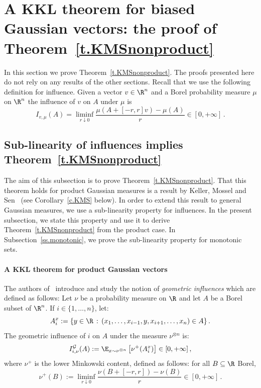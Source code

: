 \section{A KKL theorem for biased Gaussian vectors: the proof of Theorem~\ref{t.KMSnonproduct}}\label{s.KMS}

In this section we prove Theorem~\ref{t.KMSnonproduct}. The proofs presented here do not rely on any results of the other sections. Recall that we use the following definition for influence. Given a vector $v\in\R^n$ and a Borel probability measure $\mu$ on $\R^n$ the influence of $v$ on $A$ under $\mu$ is
\[
I_{v,\mu}(A)=\underset{r \downarrow 0}{\liminf}\frac{\mu \left(A+[-r,r]v \right) - \mu \left(A \right)}{r} \in [0,+\infty]\,.
\]
\subsection{Sub-linearity of influences implies Theorem~\ref{t.KMSnonproduct}}\label{ss.KMSnonproduct}

The aim of this subsection is to prove Theorem~\ref{t.KMSnonproduct}. That this theorem holds for product Gaussian measures is a result by Keller, Mossel and Sen~\cite{keller2012geometric} (see Corollary~\ref{c.KMS} below). In order to extend this result to general Gaussian measures, we use a sub-linearity property for influences. In the present subsection, we state this property and use it to derive Theorem~\ref{t.KMSnonproduct} from the product case. In Subsection~\ref{ss.monotonic}, we prove the sub-linearity property for monotonic sets.

\paragraph{A KKL theorem for product Gaussian vectors} The authors of~\cite{keller2012geometric} introduce and study the notion of \emph{geometric influences} which are defined as follows: Let $\nu$ be a probability measure on $\R$ and let $A$ be a Borel subset of $\R^n$. If $i \in \lbrace 1,\dots, n \rbrace$, let:
\[
A_i^x := \lbrace y \in \R \, : \, (x_1,\dots, x_{i-1}, y, x_{i+1},\dots, x_n) \in A \rbrace \,.
\]
The geometric influence of $i$ on $A$ under the measure $\nu^{\otimes n}$ is:
\[
I^\mathcal{G}_{i,\nu}(A) := \E_{x \sim \nu^{\otimes n}} \left[\nu^+(A_i^x) \right] \in [0,+\infty] \,,
\]
where $\nu^+$ is the lower Minkowski content, defined as follows: for all $B \subseteq \R$ Borel,
\[
\nu^+(B) := \underset{r \downarrow 0}{\liminf} \frac{\nu\left(B+[-r,r]\right) - \nu \left(B\right)}{r} \in [0,+\infty] \,.
\]


